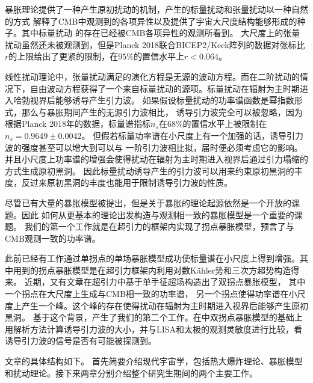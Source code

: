 暴胀理论提供了一种产生原初扰动的机制，产生的标量扰动和张量扰动以一种自然的方式
解释了CMB中观测到的各项异性以及提供了宇宙大尺度结构能够形成的种子。其中标量扰动
的存在已经被CMB各项异性的观测所看到\citep{akrami2018planck}。
大尺度上的张量扰动虽然还未被观测到，但是Planck
2018联合BICEP2/Keck阵列的数据对张标比$r$的上限给出了更紧的限制，在$95\%$的置信水平上$r<0.064$。

线性扰动理论中，张量扰动满足的演化方程是无源的波动方程。而在二阶扰动的情况下，自由波动方程获得了一个来自标量扰动的源项\citep{matarrese1998relativistic,acquaviva2002second}。标量扰动在辐射为主时期进入哈勃视界后能够诱导产生引力波。
如果假设标量扰动的功率谱函数是幂指数形式，那么与暴胀期间产生的无源引力波相比，
诱导引力波完全可以被忽略\citep{ananda2007cosmological,baumann2007gravitational}，因为根据Planck
2018年的数据，标量谱指标$n_{s}$在$68\%$的置信水平上被限制在$n_{s}=0.9649\pm 0.0042$。
但假若标量功率谱在小尺度上有一个加强的话，诱导引力波的强度甚至可以增大到可以与
一阶引力波相比拟，届时便必须考虑它的影响\citep{assadullahi2009gravitational,alabidi2013observable,alabidi2012observable,chen2019pulsar,cai2019gravitational,inomata2019gravitational,cai2019universal}。并且小尺度上功率谱的增强会使得扰动在辐射为主时期进入视界后通过引力塌缩的方式生成原初黑洞\citep{garcia1996density,clesse2015massive,yokoyama1995formation,dalianis2019primordial,gao2018primordial,di2018primordial,garcia2017primordial,garcia2016gravitational}。
因此标量扰动诱导产生的引力波可以用来约束原初黑洞的丰度，反过来原初黑洞的丰度也能用于限制诱导引力波的性质。

尽管已有大量的暴胀模型被提出，但是关于暴胀的理论起源依然是一个开放的课题。因此
如何从更基本的理论出发构造与观测相一致的暴胀模型是一个重要的课题。
我们的第一个工作就是在超引力的框架内实现了拐点暴胀模型，预言了与CMB观测一致的功率谱。

此前已经有工作\citep{garcia1702phys}通过单拐点的单场暴胀模型成功使标量谱在小尺度上得到增强。其中用到的拐点暴胀模型是在超引力框架内利用对数K\"ahler势和三次方超势构造得来\citep{gao2015inflection}。
近期，又有文章在超引力中基于单手征超场构造出了双拐点暴胀模型\citep{gao2018primordial}，
其中一个拐点在大尺度上生成与CMB相一致的功率谱，
另一个拐点使得功率谱在小尺度上产生一个峰。这个峰的存在使得扰动在辐射为主时期进入视界后能够产生原初黑洞。
基于这个背景，产生了我们的第二个工作。在\citep{gao2018primordial}中双拐点暴胀模型的基础上
用解析方法计算诱导引力波的大小，并与LISA和太极的观测灵敏度进行比较，看诱导引力波的信号是否有可能被探测到。

文章的具体结构如下。
首先简要介绍现代宇宙学，包括热大爆炸理论、暴胀模型和扰动理论。接下来两章分别介绍整个研究生期间的两个主要工作。

